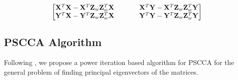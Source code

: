 \documentclass{llncs}
\newcommand{\X}{{\bf X}}
\newcommand{\Y}{{\bf Y}}
\newcommand{\Z}{{\bf Z}}
\newcommand{\bs}{\boldsymbol}
\newcommand{\bSigma}{\boldsymbol \Sigma}
\begin{document}
\begin{eqnarray}
\label{matrices}
\begin{bmatrix}
\X^T \X - \X^T \Z_w \Z_w^T \X  ~~~~&~~~~   \X^T \Y - \X^T \Z_w \Z_w^T \Y  \\
\Y^T \X - \Y^T \Z_w \Z_w^T \X   ~~~~&~~~~  \Y^T \Y- \Y^T \Z_w \Z_w^T \Y 
\end{bmatrix}
\end{eqnarray}








\subsection{PSCCA Algorithm}
Following \cite{golub}, we propose a power iteration based algorithm for PSCCA for the general problem of finding principal eigenvectors of the matrices.
\end{document}
